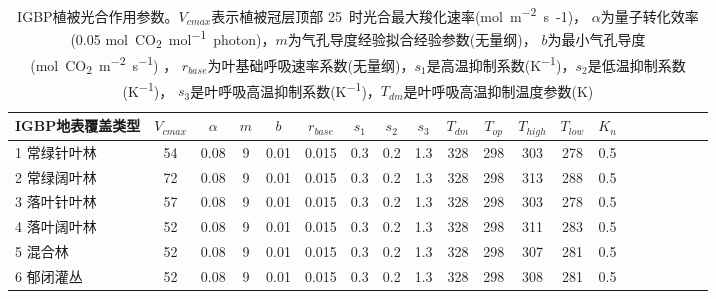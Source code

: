 \begin{landscape}
\begin{table}[htbp]
        \centering
        \caption[IGBP植被光合作用参数]{IGBP植被光合作用参数。$V_{cmax}$表示植被冠层顶部 25~\textcelsius 时光合最大羧化速率(\unit{mol.m^{-2}.s{-1}})，
        $\alpha$为量子转化效率(0.05 \unit{mol.CO_2.mol^{-1}.photon})，$m$为气孔导度经验拟合经验参数(无量纲)，
        $b$为最小气孔导度(\unit{mol.CO_2.m^{-2}.s^{-1}}) ，
        $r_{base}$为叶基础呼吸速率系数(无量纲)，$s_1$是高温抑制系数(\unit{K^{-1}})，$s_2$是低温抑制系数(\unit{K^{-1}})，
        $s_3$是叶呼吸高温抑制系数(\unit{K^{-1}})，$T_{dm}$是叶呼吸高温抑制温度参数(K)}
        \label{tab:IGBP植被光合作用参数1}
        \begin{tabular}{@{}lccccccccccccccccccc@{}}
        \toprule
        IGBP地表覆盖类型     &$ V_{cmax}$ & $\alpha$ & $m$& $b$ & $r_{base}$ & $s_1$ & $s_2$ & $s_3$ & $T_{dm}$ & $T_{op}$ & $T_{high}$ & $T_{low}$ & $K_n$  \\ \midrule
        1 常绿针叶林       & 54 & 0.08 & 9 & 0.01 & 0.015 & 0.3 & 0.2 & 1.3 & 328 & 298 & 303 & 278 & 0.5 \\
        2 常绿阔叶林       & 72          & 0.08          & 9          & 0.01          & 0.015          & 0.3          & 0.2          & 1.3          & 328          & 298          & 313          & 288          & 0.5          \\
        3 落叶针叶林       & 57          & 0.08          & 9          & 0.01          & 0.015          & 0.3          & 0.2          & 1.3          & 328          & 298          & 303          & 278          & 0.5          \\
        4 落叶阔叶林       & 52          & 0.08          & 9          & 0.01          & 0.015          & 0.3          & 0.2          & 1.3          & 328          & 298          & 311          & 283          & 0.5          \\
        5 混合林         & 52          & 0.08          & 9          & 0.01          & 0.015          & 0.3          & 0.2          & 1.3          & 328          & 298          & 307          & 281          & 0.5          \\
        6 郁闭灌丛        & 52          & 0.08          & 9          & 0.01          & 0.015          & 0.3          & 0.2          & 1.3          & 328          & 298          & 308          & 281          & 0.5          \\

\end{tabular}
\end{table}
\end{landscape}
